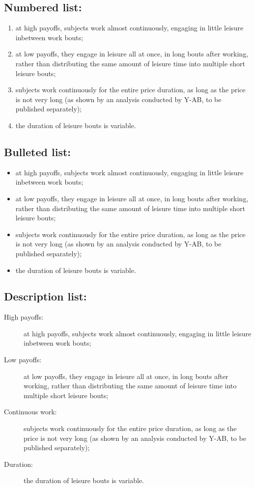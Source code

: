 \documentclass[NETN,manuscript]{stjour-new}
\begin{document}
\subsection{Numbered list:}

\begin{enumerate}
\item at high 
payoffs, subjects work almost continuously, engaging in little leisure
inbetween work bouts; 
\item at low payoffs, they 
engage in leisure all at once, in long bouts after working, rather
than distributing the same amount of leisure time into multiple short
leisure bouts; 
\item subjects work continuously for the entire price duration, as long as
the price is not very long (as shown by an analysis conducted by
Y-AB, to be published separately);  
\item the duration of leisure bouts is variable.
\end{enumerate}


\subsection{Bulleted list:}

\begin{itemize}
\item at high 
payoffs, subjects work almost continuously, engaging in little leisure
inbetween work bouts; 
\item at low payoffs, they 
engage in leisure all at once, in long bouts after working, rather
than distributing the same amount of leisure time into multiple short
leisure bouts; 
\item subjects work continuously for the entire price duration, as long as
the price is not very long (as shown by an analysis conducted by
Y-AB, to be published separately);  
\item the duration of leisure bouts is variable.
\end{itemize}

\subsection{Description list:}
\begin{description}
\item[High payoffs:] at high 
payoffs, subjects work almost continuously, engaging in little leisure
inbetween work bouts; 
\item[Low payoffs:] at low payoffs, they 
engage in leisure all at once, in long bouts after working, rather
than distributing the same amount of leisure time into multiple short
leisure bouts; 
\item[Continuous work:] subjects work continuously for the entire price duration, as long as
the price is not very long (as shown by an analysis conducted by Y-AB, to be published separately); 
\item[Duration:] the duration of leisure bouts is variable.
\end{description}
\end{document}
